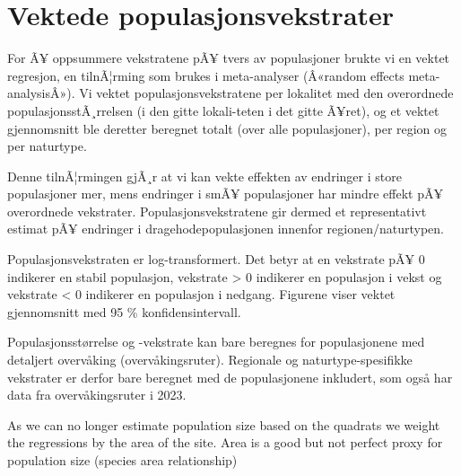 \documentclass[
  letterpaper,
  DIV=11,
  numbers=noendperiod]{scrreport}
\begin{document}
\hypertarget{section-1}{%
\section{}\label{section-1}}


\hypertarget{vektede-populasjonsvekstrater}{%
\chapter{Vektede
populasjonsvekstrater}\label{vektede-populasjonsvekstrater}}

For Ã¥ oppsummere vekstratene pÃ¥ tvers av populasjoner brukte vi en
vektet regresjon, en tilnÃ¦rming som brukes i meta-analyser (Â«random
effects meta-analysisÂ»). Vi vektet populasjonsvekstratene per lokalitet
med den overordnede populasjonsstÃ¸rrelsen (i den gitte lokali-teten i
det gitte Ã¥ret), og et vektet gjennomsnitt ble deretter beregnet totalt
(over alle populasjoner), per region og per naturtype.

Denne tilnÃ¦rmingen gjÃ¸r at vi kan vekte effekten av endringer i store
populasjoner mer, mens endringer i smÃ¥ populasjoner har mindre effekt
pÃ¥ overordnede vekstrater. Populasjonsvekstratene gir dermed et
representativt estimat pÃ¥ endringer i dragehodepopulasjonen innenfor
regionen/naturtypen.

Populasjonsvekstraten er log-transformert. Det betyr at en vekstrate pÃ¥
0 indikerer en stabil populasjon, vekstrate \textgreater{} 0 indikerer
en populasjon i vekst og vekstrate \textless{} 0 indikerer en populasjon
i nedgang. Figurene viser vektet gjennomsnitt med 95 \%
konfidensintervall.

Populasjonsstørrelse og -vekstrate kan bare beregnes for populasjonene
med detaljert overvåking (overvåkingsruter). Regionale og
naturtype-spesifikke vekstrater er derfor bare beregnet med de
populasjonene inkludert, som også har data fra overvåkingsruter i 2023.

As we can no longer estimate population size based on the quadrats we
weight the regressions by the area of the site. Area is a good but not
perfect proxy for population size (species area relationship)
\end{document}
